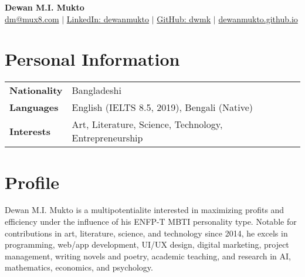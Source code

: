 \documentclass[10pt,a4paper]{article}
\begin{document}
\begin{center}
    {\LARGE\bfseries\color{headercolor} Dewan M.I. Mukto} \\
    \vspace{2pt}
    \small
    \href{mailto:hiring@mux8.com}{dm@mux8.com} $|$
    \href{https://www.linkedin.com/in/dewanmukto}{LinkedIn: dewanmukto} $|$
    \href{https://github.com/dwmk}{GitHub: dwmk} $|$
    \href{https://dewanmukto.github.io/v2}{dewanmukto.github.io}
\end{center}

\section*{Personal Information}
\begin{tabularx}{\textwidth}{@{}lX@{}}
    \textbf{Nationality} & Bangladeshi \\
    \textbf{Languages} & English (IELTS 8.5, 2019), Bengali (Native) \\
    \textbf{Interests} & Art, Literature, Science, Technology, Entrepreneurship
\end{tabularx}

\section*{Profile}
Dewan M.I. Mukto is a multipotentialite interested in maximizing profits and efficiency under the influence of his ENFP-T MBTI personality type. Notable for contributions in art, literature, science, and technology since 2014, he excels in programming, web/app development, UI/UX design, digital marketing, project management, writing novels and poetry, academic teaching, and research in AI, mathematics, economics, and psychology.
\end{document}
